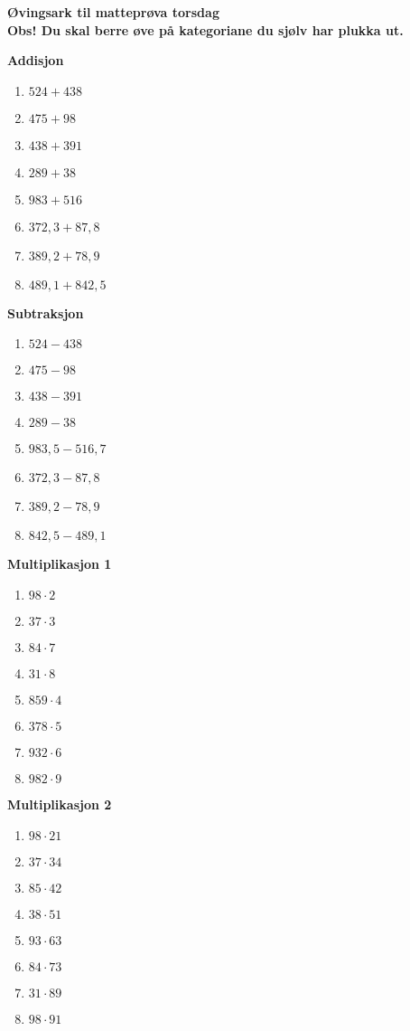\documentclass[english,hidelinks,pdftex, 11 pt, class=report,crop=false]{standalone}
\newcommand{\vsk}{\vspace{12pt}}
\begin{document}
\huge \textbf{Øvingsark til matteprøva torsdag}\\[5pt]
\textbf{ \normalsize Obs! Du skal berre øve på kategoriane du sjølv har plukka ut.}
\normalsize
\begin{multicols}{3}
\textbf{Addisjon} 
\begin{enumerate}[label=\alph*)]
	\item $ 524+438 $
	\item $ 475+98 $	
	\item $ 438+391 $		
	\item $ 289+38 $
	\item  $ 983+516 $
	\item  $ 372,3+87,8 $
	\item  $ 389,2+78,9 $
	\item  $ 489,1+842,5 $
\end{enumerate}
\vsk

\textbf{Subtraksjon} 
\begin{enumerate}[label=\alph*)]
	\item $ 524-438 $
	\item $ 475-98 $	
	\item $ 438-391 $		
	\item $ 289-38 $
	\item  $ 983,5-516,7 $
	\item  $ 372,3-87,8 $
	\item  $ 389,2-78,9 $
	\item  $ 842,5-489,1 $
\end{enumerate}
\vsk

\textbf{Multiplikasjon 1} 
\begin{enumerate}[label=\alph*)]
	\item  $ 98\cdot 2 $	
	\item $ 37\cdot3 $
	\item  $ 84\cdot 7 $
\item  $ 31\cdot 8 $	
	\item $ 859\cdot4 $	
	\item $ 378\cdot5 $		
	\item $ 932\cdot 6 $
	\item  $ 982\cdot 9 $
\end{enumerate}
\vfill\null
\columnbreak
\textbf{Multiplikasjon 2} 
\begin{enumerate}[label=\alph*)]
	\item  $ 98\cdot 21 $	
	\item $ 37\cdot34 $
	\item $ 85\cdot42 $	
	\item $ 38\cdot51 $		
	\item $ 93\cdot 63 $
	\item  $ 84\cdot 73 $
	\item  $ 31\cdot 89 $
	\item  $ 98\cdot 91 $
\end{enumerate}
\vsk


\end{multicols}
\end{document}
